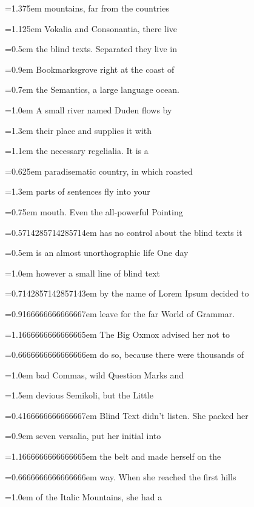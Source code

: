 \documentclass{article}
\begin{document}
 \font=1.375em mountains, far from the countries 

 \font=1.125em Vokalia and Consonantia, there live 

 \font=0.5em the blind texts. Separated they live in 

 \font=0.9em Bookmarksgrove right at the coast of 

 \font=0.7em the Semantics, a large language ocean. 

 \font=1.0em A small river named Duden flows by 

 \font=1.3em their place and supplies it with 

 \font=1.1em the necessary regelialia. It is a 

 \font=0.625em paradisematic country, in which roasted 

 \font=1.3em parts of sentences fly into your 

 \font=0.75em mouth. Even the all-powerful Pointing 

 \font=0.5714285714285714em has no control about the blind texts it 

 \font=0.5em is an almost unorthographic life One day 

 \font=1.0em however a small line of blind text 

 \font=0.7142857142857143em by the name of Lorem Ipsum decided to 

 \font=0.9166666666666667em leave for the far World of Grammar. 

 \font=1.1666666666666665em The Big Oxmox advised her not to 

 \font=0.6666666666666666em do so, because there were thousands of 

 \font=1.0em bad Commas, wild Question Marks and 

 \font=1.5em devious Semikoli, but the Little 

 \font=0.4166666666666667em Blind Text didn’t listen. She packed her 

 \font=0.9em seven versalia, put her initial into 

 \font=1.1666666666666665em the belt and made herself on the 

 \font=0.6666666666666666em way. When she reached the first hills 

 \font=1.0em of the Italic Mountains, she had a 
\end{document}
